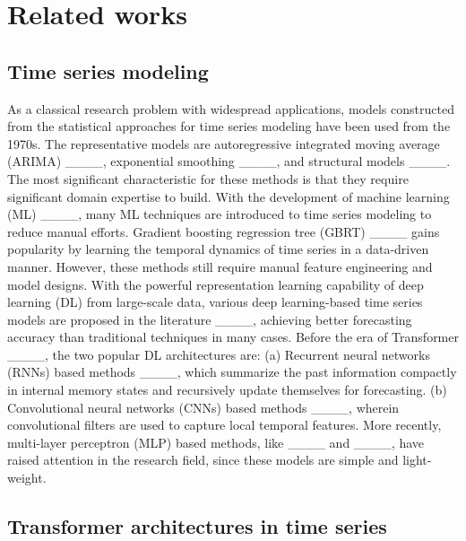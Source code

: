 \section{Related works}
\label{sec:related_works}

\subsection{Time series modeling }

As a classical research problem with widespread applications, models constructed from the statistical approaches for time series modeling have been used from the 1970s. The representative models are autoregressive integrated moving average (ARIMA) ____, exponential smoothing ____, and structural models ____. The most significant characteristic for these methods is that they require significant domain expertise to build. With the development of machine learning (ML) ____, many ML techniques are introduced to time series modeling to reduce manual efforts. Gradient boosting regression tree (GBRT) ____ gains popularity by learning the temporal dynamics of time series in a data-driven manner. However, these methods still require manual feature engineering and model designs. With the powerful representation learning capability of deep learning (DL) from large-scale data, various deep learning-based time series models are proposed in the literature ____, achieving better forecasting accuracy than traditional techniques in many cases. Before the era of Transformer ____, the two popular DL architectures are: (a) Recurrent neural networks (RNNs) based methods ____, which summarize the past information compactly in internal memory states and recursively update themselves for forecasting. (b) Convolutional neural networks (CNNs) based methods ____, wherein convolutional filters are used to capture local temporal features. More recently, multi-layer perceptron (MLP) based methods, like ____ and ____, have raised attention in the research field, since these models are simple and light-weight.  




\subsection{Transformer architectures in time series}

